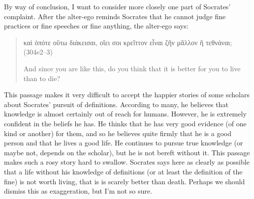 \documentclass[11pt]{article}
\begin{document}
By way of conclusion, I want to consider more closely one part of Socrates'
complaint.  After the alter-ego reminds Socrates that he cannot judge fine
practices or fine speeches or fine anything, the alter-ego says:

\begin{quote}

    {\g
    καὶ ὁπότε οὕτω διάκεισαι, οἴει σοι κρεῖττον εἶναι ζῆν μᾶλλον
    ἢ τεθνάναι;
    } (304e2--3)

    And since you are like this, do you think that it is better for you to
    live than to die?

\end{quote}

This passage makes it very difficult to accept the happier stories of some
scholars about Socrates' pursuit of definitions.  According to many, he
believes that knowledge is almost certainly out of reach for humans.
However, he is extremely confident in the beliefs he has.  He thinks that
he has very good evidence (of one kind or another) for them, and so he
believes quite firmly that he is a good person and that he lives a good
life.  He continues to pursue true knowledge (or maybe not, depends on the
scholar), but he is not bereft without it.  This passage makes such a rosy
story hard to swallow.  Socrates says here as clearly as possible that
a life without his knowledge of definitions (or at least the definition of
the fine) is not worth living, that is is scarely better than death.
Perhaps we should dismiss this as exaggeration, but I'm not so sure.



\newpage


\end{document}

